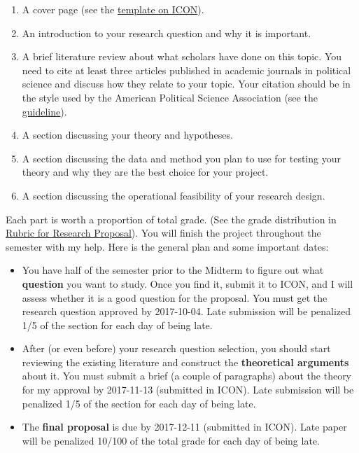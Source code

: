 \documentclass[11pt,]{article}
\providecommand{\tightlist}{%
  \setlength{\itemsep}{0pt}\setlength{\parskip}{0pt}}
\theoremstyle{definition}
\theoremstyle{definition}
\theoremstyle{definition}
\theoremstyle{remark}
\begin{document}
\begin{enumerate}
\def\labelenumi{\arabic{enumi}.}
\tightlist
\item
  A cover page (see the
  \href{https://uiowa.instructure.com/courses/65855/files/4424694?module_item_id=1468917}{template
  on ICON}).
\item
  An introduction to your research question and why it is important.
\item
  A brief literature review about what scholars have done on this topic.
  You need to cite at least three articles published in academic
  journals in political science and discuss how they relate to your
  topic. Your citation should be in the style used by the American
  Political Science Association (see the
  \href{http://www.apsanet.org/portals/54/Files/Publications/APSAStyleManual2006.pdf}{guideline}).
\item
  A section discussing your theory and hypotheses.
\item
  A section discussing the data and method you plan to use for testing
  your theory and why they are the best choice for your project.
\item
  A section discussing the operational feasibility of your research
  design.
\end{enumerate}

Each part is worth a proportion of total grade. (See the grade
distribution in \protect\hyperlink{id}{Rubric for Research Proposal}).
You will finish the project throughout the semester with my help. Here
is the general plan and some important dates:

\begin{itemize}
\tightlist
\item
  You have half of the semester prior to the Midterm to figure out what
  \textbf{question} you want to study. Once you find it, submit it to
  ICON, and I will assess whether it is a good question for the
  proposal. You must get the research question approved by 2017-10-04.
  Late submission will be penalized 1/5 of the section for each day of
  being late.
\item
  After (or even before) your research question selection, you should
  start reviewing the existing literature and construct the
  \textbf{theoretical arguments} about it. You must submit a brief (a
  couple of paragraphs) about the theory for my approval by 2017-11-13
  (submitted in ICON). Late submission will be penalized 1/5 of the
  section for each day of being late.
\item
  The \textbf{final proposal} is due by 2017-12-11 (submitted in ICON).
  Late paper will be penalized 10/100 of the total grade for each day of
  being late.
\end{itemize}
\end{document}
